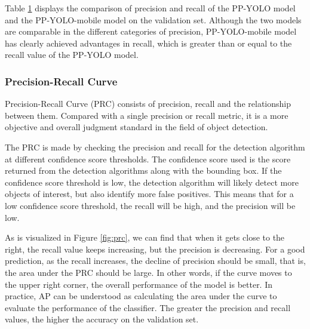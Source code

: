 \documentclass[sensors,article,submit,moreauthors,pdftex]{Definitions/mdpi}
\begin{document}
\begin{paracol}{2}
\begin{table}[htbp]
\begin{tabular}{lccccc}
\bottomrule
\end{tabular}
\label{tbl:precision}
\end{table}

Table \ref{tbl:precision} displays the comparison of precision and recall of the PP-YOLO model and the PP-YOLO-mobile model on the validation set. Although the two models are comparable in the different categories of precision, PP-YOLO-mobile model has clearly achieved advantages in recall, which is greater than or equal to the recall value of the PP-YOLO model.


\subsubsection{Precision-Recall Curve}
Precision-Recall Curve (PRC) consists of precision, recall and the relationship between them. Compared with a single precision or recall metric, it is a more objective and overall judgment standard in the field of object detection. 

The PRC is made by checking the precision and recall for the detection algorithm at different confidence score thresholds. The confidence score used is the score returned from the detection algorithms along with the bounding box. If the confidence score threshold is low, the detection algorithm will likely detect more objects of interest, but also identify more false positives. This means that for a low confidence score threshold, the recall will be high, and the precision will be low.

As is visualized in Figure \ref{fig:prc}, we can find that when it gets close to the right, the recall value keeps increasing, but the precision is decreasing. For a good prediction, as the recall increases, the decline of precision should be small, that is, the area under the PRC should be large. In other words, if the curve moves to the upper right corner, the overall performance of the model is better. In practice, AP can be understood as calculating the area under the curve to evaluate the performance of the classifier. The greater the precision and recall values, the higher the accuracy on the validation set.


\end{paracol}
\end{document}
